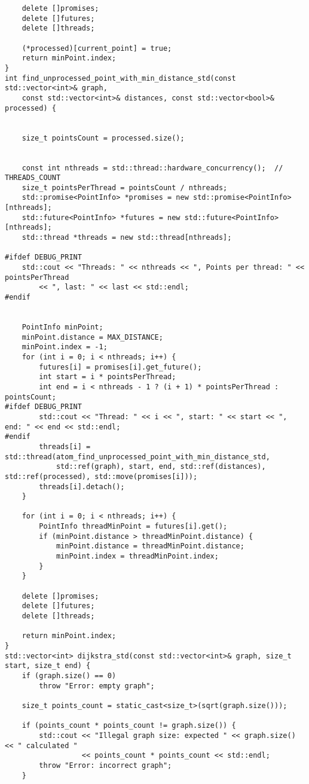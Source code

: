\documentclass{report}
\begin{document}
\begin{lstlisting}
    delete []promises;
    delete []futures;
    delete []threads;

    (*processed)[current_point] = true;
    return minPoint.index;
}
int find_unprocessed_point_with_min_distance_std(const std::vector<int>& graph,
    const std::vector<int>& distances, const std::vector<bool>& processed) {


    size_t pointsCount = processed.size();


    const int nthreads = std::thread::hardware_concurrency();  //  THREADS_COUNT
    size_t pointsPerThread = pointsCount / nthreads;
    std::promise<PointInfo> *promises = new std::promise<PointInfo>[nthreads];
    std::future<PointInfo> *futures = new std::future<PointInfo>[nthreads];
    std::thread *threads = new std::thread[nthreads];

#ifdef DEBUG_PRINT
    std::cout << "Threads: " << nthreads << ", Points per thread: " << pointsPerThread
        << ", last: " << last << std::endl;
#endif


    PointInfo minPoint;
    minPoint.distance = MAX_DISTANCE;
    minPoint.index = -1;
    for (int i = 0; i < nthreads; i++) {
        futures[i] = promises[i].get_future();
        int start = i * pointsPerThread;
        int end = i < nthreads - 1 ? (i + 1) * pointsPerThread : pointsCount;
#ifdef DEBUG_PRINT
        std::cout << "Thread: " << i << ", start: " << start << ", end: " << end << std::endl;
#endif
        threads[i] = std::thread(atom_find_unprocessed_point_with_min_distance_std,
            std::ref(graph), start, end, std::ref(distances), std::ref(processed), std::move(promises[i]));
        threads[i].detach();
    }

    for (int i = 0; i < nthreads; i++) {
        PointInfo threadMinPoint = futures[i].get();
        if (minPoint.distance > threadMinPoint.distance) {
            minPoint.distance = threadMinPoint.distance;
            minPoint.index = threadMinPoint.index;
        }
    }

    delete []promises;
    delete []futures;
    delete []threads;

    return minPoint.index;
}
std::vector<int> dijkstra_std(const std::vector<int>& graph, size_t start, size_t end) {
    if (graph.size() == 0)
        throw "Error: empty graph";

    size_t points_count = static_cast<size_t>(sqrt(graph.size()));

    if (points_count * points_count != graph.size()) {
        std::cout << "Illegal graph size: expected " << graph.size() << " calculated "
                  << points_count * points_count << std::endl;
        throw "Error: incorrect graph";
    }


\end{lstlisting}
\end{document}
